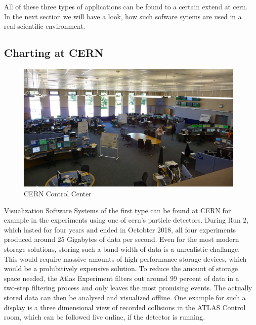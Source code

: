 All of these three types of applications can be found to a certain extend at \gls{cern}. In the next section we will have a look, how such sofware sytems are used in a real scientific environment.





\subsection{Charting at CERN}
\label{sec:fundamentals:cerncharting}

\begin{figure}[h]
    \centering
    \includegraphics[width=14cm]{resources/img/CernControlCenter}
    \caption{CERN Control Center}
    \label{fig:ccc}
\end{figure}

Visualization Software Systems of the first type can be found at CERN for example in the experiments using one of \gls{cern}'s particle detectors. During Run 2, which lasted for four years and ended in Octobter 2018, all four experiments produced around 25 Gigabytes of data per second. Even for the most modern storage solutions, storing such a band-width of data is a unrealistic challange. This would require massive amounts of high performance storage devices, which would be a prohibitively expensive solution. To reduce the amount of storage space needed, the Atlas Experiment filters out around 99 percent of data in a two-step filtering process and only leaves the most promising events. The actually stored data can then be analysed and visualized offline. One example for such a display is a three dimensional view of recorded collisions in the ATLAS Control room, which can be followed live online, if the detector is running.
\cite{LhcDataStorage, LhcRun2, AtlasLiveCollisions, AtlasTrigger}

